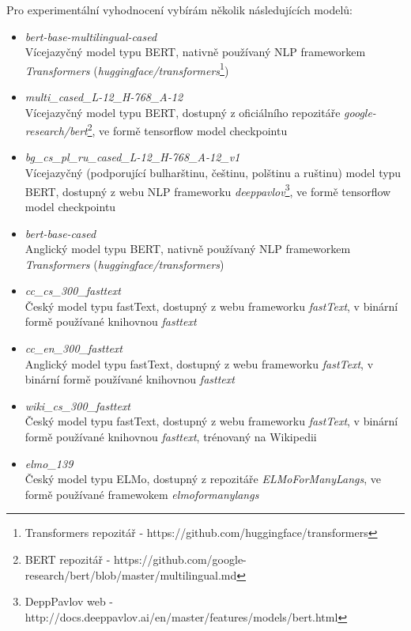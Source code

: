 \documentclass[thesis=M,czech]{FITthesis}[2019/12/23]
\begin{document}
Pro experimentální vyhodnocení vybírám několik následujících modelů:
\begin{itemize}
    \item \textit{bert-base-multilingual-cased}\\
    Vícejazyčný model typu BERT, nativně používaný NLP frameworkem \textit{Transformers} (\textit{huggingface/transformers}\footnote{Transformers repozitář - https://github.com/huggingface/transformers})
    \item \textit{multi\_cased\_L-12\_H-768\_A-12}\\
    Vícejazyčný model typu BERT, dostupný z oficiálního repozitáře \textit{google-research/bert}\footnote{BERT repozitář - https://github.com/google-research/bert/blob/master/multilingual.md}, ve formě tensorflow model checkpointu
    \item \textit{bg\_cs\_pl\_ru\_cased\_L-12\_H-768\_A-12\_v1}\\
    Vícejazyčný (podporující bulharštinu, češtinu, polštinu a ruštinu) model typu BERT, dostupný z webu NLP frameworku \textit{deeppavlov}\footnote{DeppPavlov web - http://docs.deeppavlov.ai/en/master/features/models/bert.html}, ve formě tensorflow model checkpointu
    \item \textit{bert-base-cased}\\
    Anglický model typu BERT, nativně používaný NLP frameworkem \textit{Transformers} (\textit{huggingface/transformers})
    \item \textit{cc\_cs\_300\_fasttext}\\
    Český model typu fastText, dostupný z webu frameworku \textit{fastText}, v binární formě používané knihovnou \textit{fasttext}
    \item \textit{cc\_en\_300\_fasttext}\\
    Anglický model typu fastText, dostupný z webu frameworku \textit{fastText}, v binární formě používané knihovnou \textit{fasttext}
    \item \textit{wiki\_cs\_300\_fasttext}\\
    Český model typu fastText, dostupný z webu frameworku \textit{fastText}, v binární formě používané knihovnou \textit{fasttext}, trénovaný na Wikipedii
    \item \textit{elmo\_139}\\
    Český model typu ELMo, dostupný z repozitáře \textit{ELMoForManyLangs}, ve formě používané framewokem \textit{elmoformanylangs}
\end{itemize}
\end{document}
